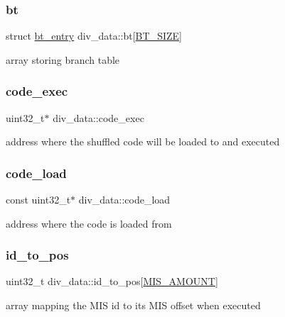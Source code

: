 \subsubsection{\texorpdfstring{bt}{bt}}
{\footnotesize\ttfamily struct \hyperlink{structbt__entry}{bt\+\_\+entry} div\+\_\+data\+::bt\mbox{[}\hyperlink{div__data_8h_ad92e5a361600001505e57ae60af38ce7}{B\+T\+\_\+\+S\+I\+ZE}\mbox{]}}

array storing branch table \mbox{\label{structdiv__data_a95226056db8734cc65b8b3800203a8c8}} 
\subsubsection{\texorpdfstring{code\+\_\+exec}{code\_exec}}
{\footnotesize\ttfamily uint32\+\_\+t$\ast$ div\+\_\+data\+::code\+\_\+exec}

address where the shuffled code will be loaded to and executed \mbox{\label{structdiv__data_ae09e403374ca5aaaf51c962a89d4541e}} 
\subsubsection{\texorpdfstring{code\+\_\+load}{code\_load}}
{\footnotesize\ttfamily const uint32\+\_\+t$\ast$ div\+\_\+data\+::code\+\_\+load}

address where the code is loaded from \mbox{\label{structdiv__data_ac090dfe9fdda3553a7f2f2a0bfc5413b}} 
\subsubsection{\texorpdfstring{id\+\_\+to\+\_\+pos}{id\_to\_pos}}
{\footnotesize\ttfamily uint32\+\_\+t div\+\_\+data\+::id\+\_\+to\+\_\+pos\mbox{[}\hyperlink{div__data_8h_a3132ecd423d2111501409d7956aae527}{M\+I\+S\+\_\+\+A\+M\+O\+U\+NT}\mbox{]}}

array mapping the M\+IS id to its M\+IS offset when executed \mbox{\label{structdiv__data_a2b755a737f5de109bf25f908ec6ae4bd}} 
